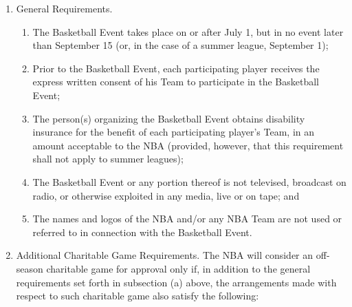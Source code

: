 \documentclass[
]{book}
\providecommand{\tightlist}{%
  \setlength{\itemsep}{0pt}\setlength{\parskip}{0pt}}
\begin{document}
\begin{enumerate}
\def\labelenumi{(\alph{enumi})}
\tightlist
\item
  General Requirements.

  \begin{enumerate}
  \def\labelenumii{(\roman{enumii})}
  \tightlist
  \item
    The Basketball Event takes place on or after July 1, but in no event later than September 15 (or, in the case of a summer league, September 1);
  \item
    Prior to the Basketball Event, each participating player receives the express written consent of his Team to participate in the Basketball Event;
  \item
    The person(s) organizing the Basketball Event obtains disability insurance for the benefit of each participating player's Team, in an amount acceptable to the NBA (provided, however, that this requirement shall not apply to summer leagues);
  \item
    The Basketball Event or any portion thereof is not televised, broadcast on radio, or otherwise exploited in any media, live or on tape; and
  \item
    The names and logos of the NBA and/or any NBA Team are not used or referred to in connection with the Basketball Event.
  \end{enumerate}
\item
  Additional Charitable Game Requirements. The NBA will consider an off-season charitable game for approval only if, in addition to the general requirements set forth in subsection (a) above, the arrangements made with respect to such charitable game also satisfy the following:


\end{enumerate}
\end{document}
